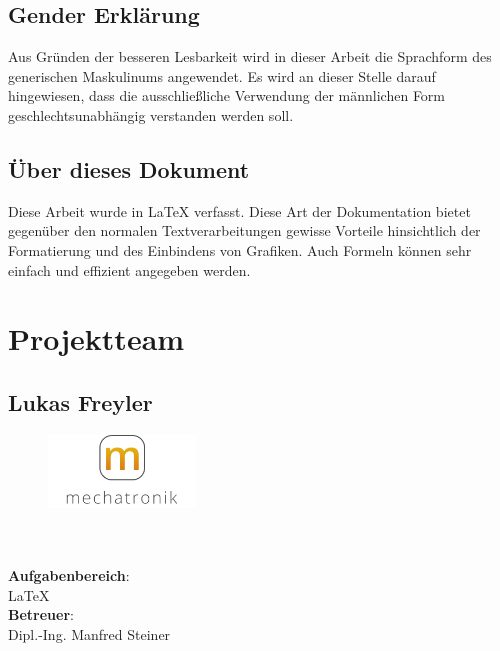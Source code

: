 \subsection*{Gender Erklärung}
\label{sec:gender-erklaerung}
Aus Gründen der besseren Lesbarkeit wird in dieser Arbeit die Sprachform des generischen Maskulinums angewendet. Es wird an dieser Stelle darauf hingewiesen, dass die ausschließliche Verwendung der männlichen Form geschlechtsunabhängig verstanden werden soll.

\subsection*{Über dieses Dokument}
\label{sec:ueber-dokument}
Diese Arbeit wurde in \LaTeX{} verfasst. Diese Art der Dokumentation bietet gegenüber den normalen Textverarbeitungen gewisse Vorteile hinsichtlich der Formatierung und des Einbindens von Grafiken. Auch Formeln können sehr einfach und effizient angegeben werden.

\clearpage

\newpage
\thispagestyle{empty}
\mbox{}

\clearpage

\section*{Projektteam}
\label{sec:projektteam}

\subsection*{Lukas Freyler}
\begin{figure}
\begin{center}
  \includegraphics[width=0.35\textwidth]{fig/logoMecha}
\end{center}
\end{figure}
\mbox{}\\
\mbox{}\\
\textbf{Aufgabenbereich}:\\
\LaTeX{}\\
\textbf{Betreuer}:\\
Dipl.-Ing. Manfred Steiner
\mbox{}\\
\mbox{}\\
\mbox{}\\
\mbox{}\\
\mbox{}\\
\mbox{}\\

